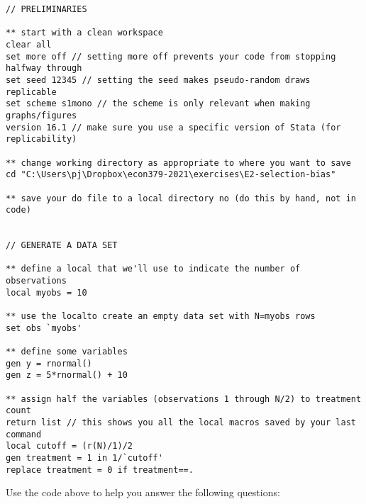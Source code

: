 \documentclass[11pt]{article}
\begin{document}
\begin{verbatim}
// PRELIMINARIES

** start with a clean workspace
clear all
set more off // setting more off prevents your code from stopping halfway through
set seed 12345 // setting the seed makes pseudo-random draws replicable
set scheme s1mono // the scheme is only relevant when making graphs/figures
version 16.1 // make sure you use a specific version of Stata (for replicability)

** change working directory as appropriate to where you want to save
cd "C:\Users\pj\Dropbox\econ379-2021\exercises\E2-selection-bias"

** save your do file to a local directory no (do this by hand, not in code)


// GENERATE A DATA SET

** define a local that we'll use to indicate the number of observations
local myobs = 10

** use the localto create an empty data set with N=myobs rows
set obs `myobs'

** define some variables
gen y = rnormal()
gen z = 5*rnormal() + 10

** assign half the variables (observations 1 through N/2) to treatment
count
return list // this shows you all the local macros saved by your last command
local cutoff = (r(N)/1)/2
gen treatment = 1 in 1/`cutoff'
replace treatment = 0 if treatment==.
\end{verbatim}

\bigskip

\noindent
Use the code above to help you answer the following questions:
\end{document}
